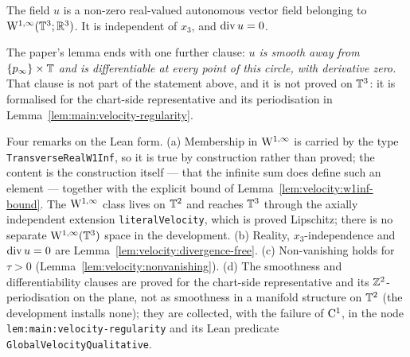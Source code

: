 \begin{lemma}
  \label{lem:global-velocity}
  \leanok
  The field $u $ is a non-zero real-valued autonomous vector field belonging to
  $\mathrm{W}^{1,\infty}(\mathbb{T}^3;\mathbb{R}^3) $.  It is independent of $x_3 $, and $\operatorname{div} u=0 $.
\end{lemma}

The paper's lemma ends with one further clause: \emph{$u $ is smooth away from
$\{p_\infty\}\times\mathbb{T} $ and is differentiable at every point of this circle, with derivative
zero.}  That clause is not part of the statement above, and it is not proved on $\mathbb{T}^3 $:
it is formalised for the chart-side representative and its periodisation in
Lemma~\ref{lem:main:velocity-regularity}.

Four remarks on the Lean form.  (a) Membership in $\mathrm{W}^{1,\infty} $ is carried by the type
\texttt{TransverseRealW1Inf}, so it is true by construction rather than proved; the
content is the construction itself --- that the infinite sum does define such an element
--- together with the explicit bound of Lemma~\ref{lem:velocity:w1inf-bound}.  The
$\mathrm{W}^{1,\infty} $ class lives on $\mathbb{T}^2 $ and reaches $\mathbb{T}^3 $ through the axially
independent extension \texttt{literalVelocity}, which is proved Lipschitz; there is no
separate $\mathrm{W}^{1,\infty}(\mathbb{T}^3) $ space in the development.  (b) Reality,
$x_3 $-independence and $\operatorname{div} u=0 $ are Lemma~\ref{lem:velocity:divergence-free}.
(c) Non-vanishing holds for $\tau>0 $ (Lemma~\ref{lem:velocity:nonvanishing}).
(d) The smoothness and differentiability clauses are proved for the chart-side
representative and its $\mathbb{Z}^2 $-periodisation on the plane, not as smoothness in a manifold
structure on $\mathbb{T}^2 $ (the development installs none); they are collected, with the failure
of $\mathrm{C}^1 $, in the node \texttt{lem:main:velocity-regularity} and its Lean predicate
\texttt{GlobalVelocityQualitative}.

